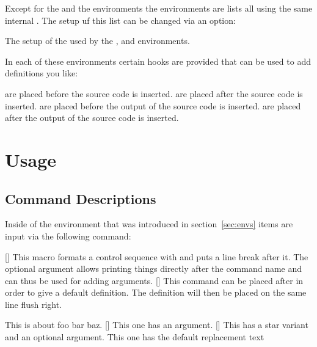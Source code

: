 \documentclass[load-preamble]{cnltx-doc}
\begin{document}
Except for the  and the  environments the
environments are lists all using the same internal .  The setup uf
this list can be changed via an option:

\begin{options}
    The setup of the  used by the ,  and
     environments.
\end{options}

In each of these environments certain hooks are provided
that can be used to add definitions you like:
\begin{options}
     are placed before the source code is inserted.
     are placed after the source code is inserted.
     are placed before the output of the source code is
    inserted.
     are placed after the output of the source code is
    inserted.
\end{options}

\section{Usage}
\subsection{Command Descriptions}\label{sec:usage:commands}
Inside of the environment  that was introduced in
section~\ref{sec:envs} items are input via the following command:
\begin{commands}
  [\sarg{}]
    This macro formats a control sequence with  and puts a line break
    after it.  The optional argument allows printing things directly after the
    command name and can thus be used for adding arguments.
  []
    This command can be placed after  in order to give a default
    definition.  The definition will then be placed on the same line flush
    right.
\end{commands}
\begin{example}
  \begin{commands}
      This is about foo bar baz.
    []
      This one has an argument.
    [\sarg{}]
      This has a star variant and an optional argument.
      This one has the default replacement text 
  \end{commands}
\end{example}
\end{document}
